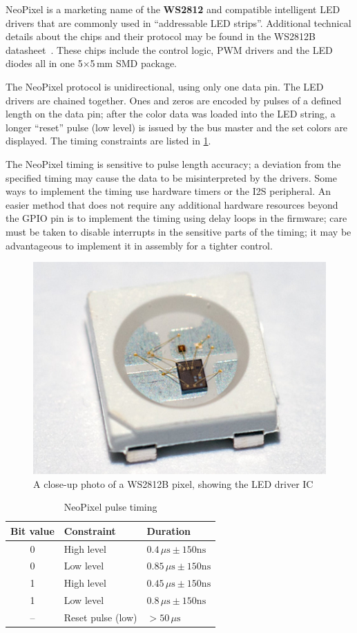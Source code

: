 NeoPixel is a marketing name of the \textbf{WS2812} and compatible intelligent \gls{LED} drivers that are commonly used in ``addressable \gls{LED} strips''. Additional technical details about the chips and their protocol may be found in the WS2812B datasheet~\cite{neopixel-ds}. These chips include the control logic, PWM drivers and the \gls{LED} diodes all in one 5$\times$5\,mm SMD package.

The NeoPixel protocol is unidirectional, using only one data pin. The \gls{LED} drivers are chained together. Ones and zeros are encoded by pulses of a defined length on the data pin; after the color data was loaded into the \gls{LED} string, a longer ``reset'' pulse (low level) is issued by the bus master and the set colors are displayed. The timing constraints are listed in \cref{fig:ws2812-dia}.

The NeoPixel timing is sensitive to pulse length accuracy; a deviation from the specified timing may cause the data to be misinterpreted by the drivers. Some ways to implement the timing use hardware timers or the \gls{I2S} peripheral. An easier method that does not require any additional hardware resources beyond the \gls{GPIO} pin is to implement the timing using delay loops in the firmware; care must be taken to disable interrupts in the sensitive parts of the timing; it may be advantageous to implement it in assembly for a tighter control.

\begin{figure}[h]
	\centering
	\includegraphics[width=.5\textwidth] {img/ws2812b-detail.jpg}
	\caption{\label{fig:ws2812-detail}A close-up photo of a WS2812B pixel, showing the LED driver IC}
\end{figure}

\begin{table}[h]
	\centering
	\begin{tabular}{cll}
		\toprule
		\textbf{Bit value} & \textbf{Constraint} & \textbf{Duration} \\
		\midrule
		0 & High level & $0.4\,\mu\mathrm{s}\pm150\mathrm{ns}$ \\
		0 & Low level & $0.85\,\mu\mathrm{s}\pm150\mathrm{ns}$ \\
		1 & High level & $0.45\,\mu\mathrm{s}\pm150\mathrm{ns}$ \\
		1 & Low level & $0.8\,\mu\mathrm{s}\pm150\mathrm{ns}$ \\
		-- & Reset pulse (low) & $>50\,\mu\mathrm{s}$ \\
		\bottomrule
	\end{tabular}
	\caption{\label{fig:ws2812-dia}NeoPixel pulse timing}
\end{table}





